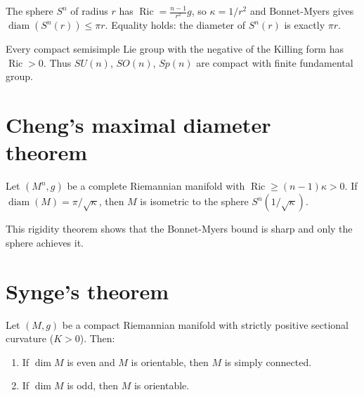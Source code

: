 \begin{example}
The sphere $S^n$ of radius $r$ has $\operatorname{Ric} = \frac{n-1}{r^2} g$,
so $\kappa = 1/r^2$ and Bonnet-Myers gives $\operatorname{diam}(S^n(r)) \leq \pi r$.
Equality holds: the diameter of $S^n(r)$ is exactly $\pi r$.
\end{example}

\begin{example}
Every compact semisimple Lie group with the negative of the Killing form has
$\operatorname{Ric} > 0$. Thus $SU(n)$, $SO(n)$, $Sp(n)$ are compact with
finite fundamental group.
\end{example}

\section{Cheng's maximal diameter theorem}

\begin{theorem}[Cheng]
\label{thm:cheng}
Let $(M^n, g)$ be a complete Riemannian manifold with
$\operatorname{Ric} \geq (n-1)\kappa > 0$. If $\operatorname{diam}(M) = \pi/\sqrt{\kappa}$,
then $M$ is isometric to the sphere $S^n(1/\sqrt{\kappa})$.
\end{theorem}

\begin{remark}
This rigidity theorem shows that the Bonnet-Myers bound is sharp and only the
sphere achieves it.
\end{remark}

\section{Synge's theorem}

\begin{theorem}[Synge]
\label{thm:synge}
Let $(M, g)$ be a compact Riemannian manifold with strictly positive sectional
curvature ($K > 0$). Then:
\begin{enumerate}
    \item If $\dim M$ is even and $M$ is orientable, then $M$ is simply connected.
    \item If $\dim M$ is odd, then $M$ is orientable.
\end{enumerate}
\end{theorem}

